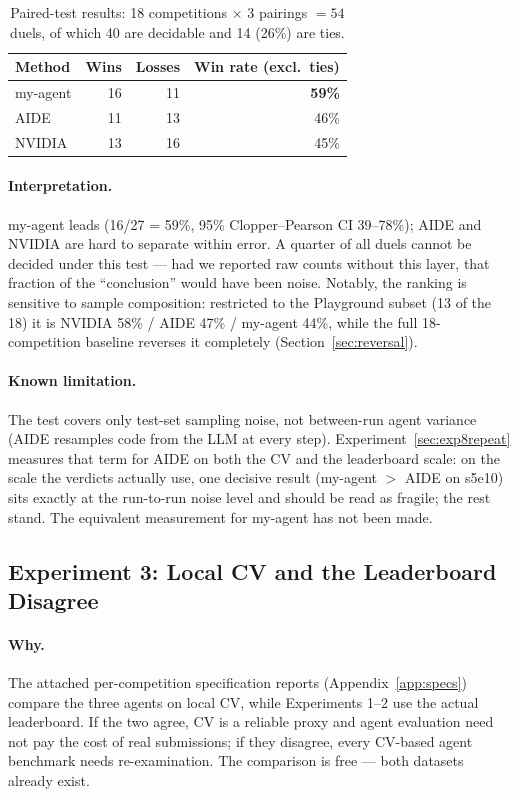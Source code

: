 \documentclass[11pt,a4paper]{article}
\begin{document}
\begin{table}[htbp]
\centering\small
\caption{Paired-test results: 18 competitions $\times$ 3 pairings $= 54$ duels, of which 40 are decidable and 14 (26\%) are ties.}
\label{tab:winrates}
\begin{tabular}{@{}lrrr@{}}
\toprule
\textbf{Method} & \textbf{Wins} & \textbf{Losses} & \textbf{Win rate (excl.\ ties)} \\
\midrule
my-agent & 16 & 11 & \textbf{59\%} \\
AIDE     & 11 & 13 & 46\% \\
NVIDIA   & 13 & 16 & 45\% \\
\bottomrule
\end{tabular}
\end{table}

\paragraph{Interpretation.} my-agent leads (16/27 = 59\%, 95\% Clopper--Pearson CI 39--78\%); AIDE and NVIDIA are hard to separate within error. A quarter of all duels cannot be decided under this test --- had we reported raw counts without this layer, that fraction of the ``conclusion'' would have been noise. Notably, the ranking is sensitive to sample composition: restricted to the Playground subset (13 of the 18) it is NVIDIA 58\% / AIDE 47\% / my-agent 44\%, while the full 18-competition baseline reverses it completely (Section~\ref{sec:reversal}).

\paragraph{Known limitation.} The test covers only test-set sampling noise, not between-run agent variance (AIDE resamples code from the LLM at every step). Experiment~\ref{sec:exp8repeat} measures that term for AIDE on both the CV and the leaderboard scale: on the scale the verdicts actually use, one decisive result (my-agent $>$ AIDE on s5e10) sits exactly at the run-to-run noise level and should be read as fragile; the rest stand. The equivalent measurement for my-agent has not been made.

\subsection{Experiment 3: Local CV and the Leaderboard Disagree}
\label{sec:exp3}

\paragraph{Why.} The attached per-competition specification reports (Appendix~\ref{app:specs}) compare the three agents on local CV, while Experiments 1--2 use the actual leaderboard. If the two agree, CV is a reliable proxy and agent evaluation need not pay the cost of real submissions; if they disagree, every CV-based agent benchmark needs re-examination. The comparison is free --- both datasets already exist.
\end{document}
